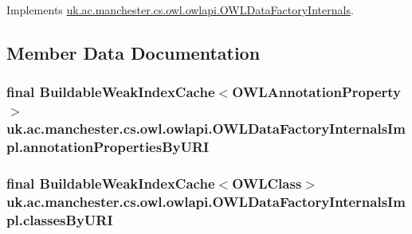 Implements \hyperlink{interfaceuk_1_1ac_1_1manchester_1_1cs_1_1owl_1_1owlapi_1_1_o_w_l_data_factory_internals_a4ff4ae6752839f402495e0a05f72deb9}{uk.\-ac.\-manchester.\-cs.\-owl.\-owlapi.\-O\-W\-L\-Data\-Factory\-Internals}.



\subsection{Member Data Documentation}
\hypertarget{classuk_1_1ac_1_1manchester_1_1cs_1_1owl_1_1owlapi_1_1_o_w_l_data_factory_internals_impl_a90f66392fff0ca2bac5ecc0fc6a0a7ad}{
\subsubsection[{annotation\-Properties\-By\-U\-R\-I}]{\setlength{\rightskip}{0pt plus 5cm}final Buildable\-Weak\-Index\-Cache$<${\bf O\-W\-L\-Annotation\-Property}$>$ uk.\-ac.\-manchester.\-cs.\-owl.\-owlapi.\-O\-W\-L\-Data\-Factory\-Internals\-Impl.\-annotation\-Properties\-By\-U\-R\-I\hspace{0.3cm}{\ttfamily [private]}}}\label{classuk_1_1ac_1_1manchester_1_1cs_1_1owl_1_1owlapi_1_1_o_w_l_data_factory_internals_impl_a90f66392fff0ca2bac5ecc0fc6a0a7ad}
\hypertarget{classuk_1_1ac_1_1manchester_1_1cs_1_1owl_1_1owlapi_1_1_o_w_l_data_factory_internals_impl_a6955ef96fe48019e017ce666f6d53773}{
\subsubsection[{classes\-By\-U\-R\-I}]{\setlength{\rightskip}{0pt plus 5cm}final Buildable\-Weak\-Index\-Cache$<${\bf O\-W\-L\-Class}$>$ uk.\-ac.\-manchester.\-cs.\-owl.\-owlapi.\-O\-W\-L\-Data\-Factory\-Internals\-Impl.\-classes\-By\-U\-R\-I\hspace{0.3cm}{\ttfamily [private]}}}\label{classuk_1_1ac_1_1manchester_1_1cs_1_1owl_1_1owlapi_1_1_o_w_l_data_factory_internals_impl_a6955ef96fe48019e017ce666f6d53773}
